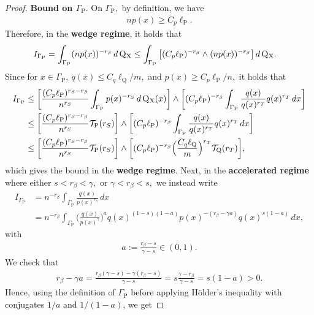 \documentclass[10pt]{article}
\newcommand{\mT}{\mathcal{T}}
\renewcommand{\P}{\operatorname{P}}
\newcommand{\Q}{\operatorname{Q}}
\newcommand{\sX}{\mathrm{X}}
\begin{document}
\begin{proof}
    \noindent\textbf{Bound on $\Gamma_{\P}.$} On $\Gamma_{\P},$ by definition, we have
    \begin{align*}
        np(x) \geq C_p\ell_{\P}.
    \end{align*}
    Therefore, in the \textbf{wedge regime}, it holds that
    \begin{align*}
        I_{\Gamma_{\P}} &= \int_{\Gamma_{\P}}(np(x))^{-r_\beta}\, d\Q\mathstrut_{\!\sX} \leq \int_{\Gamma_{\P}}\big[(C_p\ell_{\P})^{-r_\beta} \wedge (np(x))^{-r_\beta}\big]\, d\Q\mathstrut_{\!\sX}.
    \end{align*}
    Since for $x \in \Gamma_{\P}, \ q(x) \leq C_q\ell_{\Q}/m,$ and $p(x) \geq C_p\ell_{\P}/n,$ it holds that 
    \begin{align*}
        I_{\Gamma_{\P}} &\leq \bigg[\frac{(C_p\ell_{\P})^{r_S - r_\beta}}{n^{r_S}}\int_{\Gamma_{\P}}p(x)^{-r_S}\, d\Q\mathstrut_{\!\sX}(x)\bigg] \wedge \bigg[(C_p\ell_{\P})^{-r_\beta}\int_{\Gamma_{\P}}\frac{q(x)}{q(x)^{r_T}}q(x)^{r_T}\, dx\bigg]\\
        &\leq \bigg[\frac{(C_p\ell_{\P})^{r_S - r_\beta}}{n^{r_S}}\mT_{\P}(r_S)\bigg] \wedge \bigg[(C_p\ell_{\P})^{-r_\beta}\int_{\Gamma_{\P}}\frac{q(x)}{q(x)^{r_T}}q(x)^{r_T}\, dx\bigg]\\
        &\leq \bigg[\frac{(C_p\ell_{\P})^{r_S - r_\beta}}{n^{r_S}}\mT_{\P}(r_S)\bigg] \wedge \bigg[(C_p\ell_{\P})^{-r_\beta}\Big(\frac{C_q\ell_{\Q}}{m}\Big)^{r_T}\mT_{\Q}(r_T)\bigg],
    \end{align*}
    which gives the bound in the \textbf{wedge regime}. Next, in the \textbf{accelerated regime} where either $s < r_\beta < \gamma,$ or $\gamma < r_\beta < s,$ we instead write
    \begin{align*}
        I_{\Gamma_{\P}} &= n^{-r_\beta}\int_{\Gamma_{\P}}\frac{q(x)}{p(x)^{r_\beta}}\, dx \\
        &= n^{-r_\beta}\int_{\Gamma_{\P}}\Big(\frac{q(x)}{p(x)^{\gamma}}\Big)^aq(x)^{(1 - s)(1 - a)}p(x)^{-(r_\beta - \gamma a)}q(x)^{s(1 - a)}\, dx,
    \end{align*}
    with 
    \begin{align}
        \label{eq.a}
        a := \tfrac{r_\beta - s}{\gamma - s} \in (0, 1).    
    \end{align}
    We check that
    \begin{align*}
        r_\beta - \gamma a = \frac{r_\beta(\gamma - s) - \gamma(r_\beta -s)}{\gamma - s} = s\frac{\gamma - r_\beta}{\gamma - s}  = s(1 - a) > 0.
    \end{align*}
    Hence, using the definition of $\Gamma_{\P}$ before applying H\"older's inequality with conjugates $1/a$ and $1/(1 - a)$, we get

\end{proof}
\end{document}
